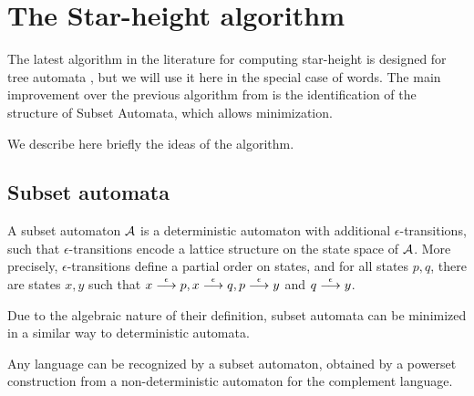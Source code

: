 \newcommand{\cB}{\mathcal B}

\section{The Star-height algorithm}

The latest algorithm in the literature for computing star-height is designed for tree automata \cite{CL08sh}, but we will use it here in the special case of words. The main improvement over the previous algorithm from \cite{Kirsten05} is the identification of the structure of Subset Automata, which allows minimization.

We describe here briefly the ideas of the algorithm.

\subsection{Subset automata}

\begin{definition}\cite{CL08sh}
A subset automaton $\mathcal{A}$ is a deterministic automaton with additional $\epsilon$-transitions, such that $\epsilon$-transitions encode a lattice structure on the state space of $\mathcal{A}$. More precisely, $\epsilon$-transitions define a partial order on states, and for all states $p,q$, there are states $x,y$ such that $x\stackrel{\epsilon}{\longrightarrow}p, x\stackrel{\epsilon}{\longrightarrow}q, p\stackrel{\epsilon}{\longrightarrow}y$ and $q\stackrel{\epsilon}{\longrightarrow}y$.
\end{definition}

Due to the algebraic nature of their definition, subset automata can be minimized in a similar way to deterministic automata.

\begin{theorem}\cite{CL08sh}
Any language can be recognized by a subset automaton, obtained by a powerset construction from a non-deterministic automaton for the complement language.
\end{theorem}

